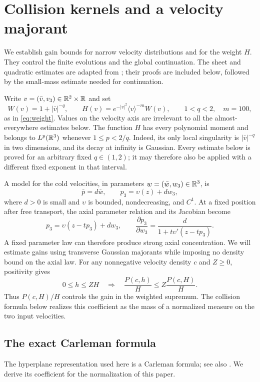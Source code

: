 \section{Collision kernels and a velocity majorant}
\label{ker:section}\label{sec:kernel}

We establish gain bounds for narrow velocity distributions and for
the weight $H$. They control the finite evolutions and the global
continuation. The sheet and quadratic estimates are adapted from
\cite[Section~3]{OpenAIPeriodic}; their proofs are included below,
followed by the small-mass estimate needed for continuation.

Write $v=(\bar v,v_3)\in\mathbb R^2\times\mathbb R$ and set
\[
 W(v)=1+|\bar v|^{-q},\qquad
 H(v)=e^{-|v|^2}\langle v\rangle^{-m}W(v),
 \qquad 1<q<2,\quad m=100,
\]
as in \eqref{eq:weight}. Values on the velocity axis are irrelevant to
all the almost-everywhere estimates below. The function $H$ has every
polynomial moment and belongs to $L^p(\mathbb R^3)$ whenever $1\leq p<2/q$.
Indeed, its only local singularity is $|\bar v|^{-q}$ in two dimensions,
and its decay at infinity is Gaussian. Every estimate below is proved
for an arbitrary fixed $q\in(1,2)$; it may therefore also be applied
with a different fixed exponent in that interval.

A model for the cold velocities, in parameters
$w=(\bar w,w_3)\in\mathbb R^3$, is
\[
 \bar p=d\bar w,\qquad p_3=\upsilon(z)+dw_3,
\]
where $d>0$ is small and $\upsilon$ is bounded, nondecreasing, and
$C^1$. At a fixed position after free transport, the axial parameter
relation and its Jacobian become
\[
 p_3=\upsilon(z-tp_3)+dw_3,\qquad
 \frac{\partial p_3}{\partial w_3}
   =\frac{d}{1+t\upsilon'(z-tp_3)}.
\]
A fixed parameter law can therefore produce strong axial
concentration. We will estimate gains using transverse Gaussian
majorants while imposing no density bound on the axial law. For any
nonnegative velocity density $c$ and $Z\geq0$, positivity gives
\[
 0\leq h\leq ZH\quad\Longrightarrow\quad
 \frac{P(c,h)}{H}\leq Z\frac{P(c,H)}{H}.
\]
Thus $P(c,H)/H$ controls the gain in the weighted supremum. The
collision formula below realizes this coefficient as the mass of a
normalized measure on the two input velocities.

\subsection{The exact Carleman formula}

The hyperplane representation used here is a Carleman formula;
see also \cite[Appendix~C]{GambaPanferovVillani2009}.
We derive its coefficient for the normalization of this paper.

